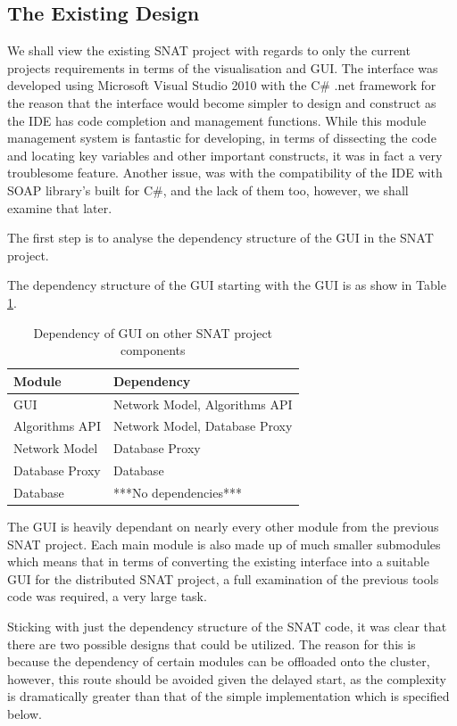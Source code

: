 \subsection{The Existing Design}
We shall view the existing SNAT project with regards to only the current projects requirements in terms of the visualisation and GUI. The interface was developed using Microsoft Visual Studio 2010 with the C\# .net framework for the reason that the interface would become simpler to design and construct as the IDE has code completion and management functions. While this module management system is fantastic for developing, in terms of dissecting the code and locating key variables and other important constructs, it was in fact a very troublesome feature. Another issue, was with the compatibility of the IDE with SOAP library's built for C\#, and the lack of them too, however, we shall examine that later.


The first step is to analyse the dependency structure of the GUI in the SNAT project. 

The dependency structure of the GUI starting with the GUI is as show in Table \ref{tab:guidep}.

\begin{table}%
\centering
\begin{tabular}{|l|l|}
\hline
Module & Dependency \\
\hline
GUI	& Network Model, Algorithms API \\
Algorithms API	& Network Model, Database Proxy \\
Network Model	& Database Proxy \\
Database Proxy	& Database \\
Database	& ***No dependencies*** \\
\hline
\end{tabular}
\caption{Dependency of GUI on other SNAT project components}
\label{tab:guidep}
\end{table}

The GUI is heavily dependant on nearly every other module from the previous SNAT project. Each main module is also made up of much smaller submodules which means that in terms of converting the existing interface into a suitable GUI for the distributed SNAT project, a full examination of the previous tools code was required, a very large task. 

Sticking with just the dependency structure of the SNAT code, it was clear that there are two possible designs that could be utilized. The reason for this is because the dependency of certain modules can be offloaded onto the cluster, however, this route should be avoided given the delayed start, as the complexity is dramatically greater than that of the simple implementation which is specified below.


